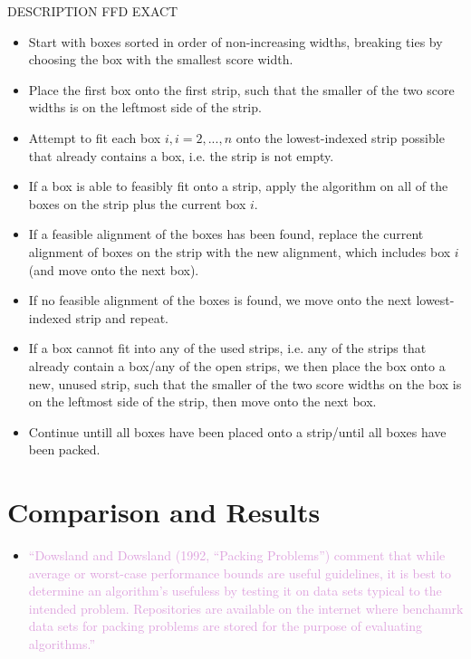 \documentclass[oribibl]{llncs}
\begin{document}
DESCRIPTION FFD EXACT
\begin{itemize}
	\item Start with boxes sorted in order of non-increasing widths, breaking ties by choosing the box with the smallest score width.
	\item Place the first box onto the first strip, such that the smaller of the two score widths is on the leftmost side of the strip.
	\item Attempt to fit each box $i, i = 2,..., n$ onto the lowest-indexed strip possible that already contains a box, i.e. the strip is not empty.
	\item If a box is able to feasibly fit onto a strip, apply the \textcolor{OliveGreen}{algorithm} on all of the boxes on the strip plus the current box $i$.
	\item If a feasible alignment of the boxes has been found, replace the current alignment of boxes on the strip with the new alignment, which includes box $i$ (and move onto the next box).
	\item If no feasible alignment of the boxes is found, we move onto the next lowest-indexed strip and repeat.
	\item If a box cannot fit into any of the used strips, i.e. any of the strips that already contain a box/any of the open strips, we then place the box onto a new, unused strip, such that the smaller of the two score widths on the box is on the leftmost side of the strip, then move onto the next box.
	\item Continue untill all boxes have been placed onto a strip/until all boxes have been packed.
\end{itemize}





\section{Comparison and Results}
\label{sec:compresult}

\begin{itemize}
	\item \textcolor{Plum}{``Dowsland and Dowsland (1992, ``Packing Problems'') comment that while average or worst-case performance bounds are useful guidelines, it is best to determine an algorithm's usefuless by testing it on data sets typical to the intended problem. Repositories are available on the internet where benchamrk data sets for packing problems are stored for the purpose of evaluating algorithms.''}
\end{itemize}
\end{document}
